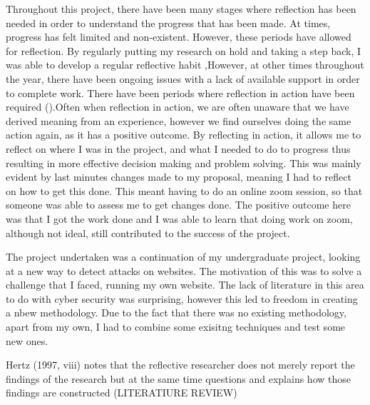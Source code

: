 

Throughout this project, there have been many stages where reflection has been needed in order to understand the progress that has been made. At times, progress has felt limited and non-existent. However, these periods have allowed for reflection. By regularly putting my research on hold and taking a step back, I was able to develop a regular reflective habit \cite{dyment2010quality},However, at other times throughout the year, there have been ongoing issues with a lack of available support in order to complete work. There have been periods where reflection in action have been required (\cite{Schon83}).Often when reflection in action, we are often unaware that we have derived meaning from an experience, however we find ourselves doing the same action again, as it has a positive outcome. By reflecting in action, it allows me to reflect on where I was in the project, and what I needed to do to progress thus resulting in more effective decision making and problem solving. This was mainly evident by last minutes changes made to my proposal, meaning I had to reflect on how to get this done. This meant having to do an online zoom session, so that someone was able to assess me to get changes done. The positive outcome here was that I got the work done and I was able to learn that doing work on zoom, although not ideal, still contributed to the success of the project.


The project undertaken was a continuation of my undergraduate project, looking at a new way to detect attacks on websites. The motivation of this was to solve a challenge that I faced, running my own website. The lack of literature in this area to do with cyber security was surprising, however this led to freedom in creating a nbew methodology. Due to the fact that there was no existing methodology, apart from my own, I had to combine some exisitng techniques and test some new ones.

Hertz (1997, viii) notes that the reflective researcher does not merely report the findings of the research but at the same time questions and explains how those findings are constructed (LITERATIURE REVIEW)
